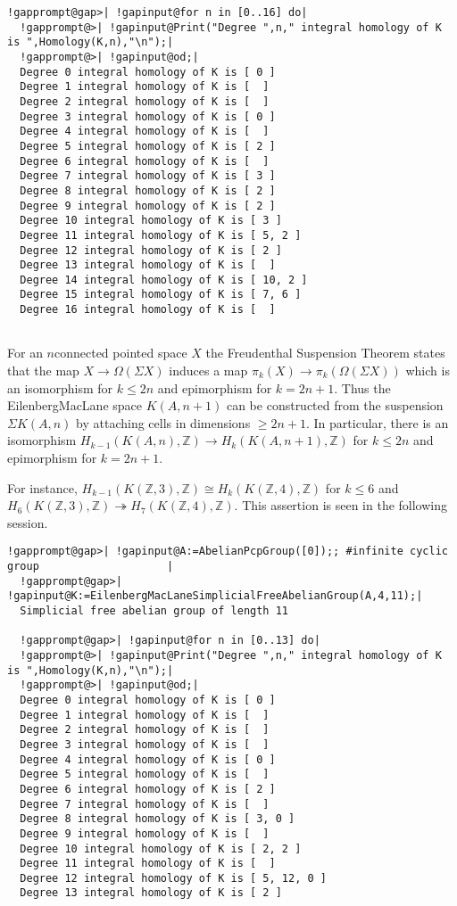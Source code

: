 \documentclass[a4paper,11pt]{report}
\begin{document}
{{\begin{Verbatim}[commandchars=!@|,fontsize=\small,frame=single,label=Example]
  !gapprompt@gap>| !gapinput@for n in [0..16] do|
  !gapprompt@>| !gapinput@Print("Degree ",n," integral homology of K is ",Homology(K,n),"\n");|
  !gapprompt@>| !gapinput@od;|
  Degree 0 integral homology of K is [ 0 ]
  Degree 1 integral homology of K is [  ]
  Degree 2 integral homology of K is [  ]
  Degree 3 integral homology of K is [ 0 ]
  Degree 4 integral homology of K is [  ]
  Degree 5 integral homology of K is [ 2 ]
  Degree 6 integral homology of K is [  ]
  Degree 7 integral homology of K is [ 3 ]
  Degree 8 integral homology of K is [ 2 ]
  Degree 9 integral homology of K is [ 2 ]
  Degree 10 integral homology of K is [ 3 ]
  Degree 11 integral homology of K is [ 5, 2 ]
  Degree 12 integral homology of K is [ 2 ]
  Degree 13 integral homology of K is [  ]
  Degree 14 integral homology of K is [ 10, 2 ]
  Degree 15 integral homology of K is [ 7, 6 ]
  Degree 16 integral homology of K is [  ]
  
\end{Verbatim}
 For an $n$\texttt{}connected pointed space $X$ the Freudenthal Suspension Theorem states that the map $X \rightarrow \Omega(\Sigma X)$ induces a map $\pi_k(X) \rightarrow \pi_k(\Omega(\Sigma X))$ which is an isomorphism for $k\le 2n$ and epimorphism for $k=2n+1$. Thus the Eilenberg\texttt{}MacLane space $K(A,n+1)$ can be constructed from the suspension $\Sigma K(A,n)$ by attaching cells in dimensions $\ge 2n+1$. In particular, there is an isomorphism $ H_{k-1}(K(A,n),\mathbb Z) \rightarrow H_k(K(A,n+1),\mathbb Z)$ for $k\le 2n$ and epimorphism for $k=2n+1$. 

 For instance, $ H_{k-1}(K(\mathbb Z,3),\mathbb Z) \cong H_k(K(\mathbb Z,4),\mathbb Z) $ for $k\le 6$ and $ H_6(K(\mathbb Z,3),\mathbb Z) \twoheadrightarrow H_7(K(\mathbb Z,4),\mathbb Z) $. This assertion is seen in the following session. 
\begin{Verbatim}[commandchars=!@|,fontsize=\small,frame=single,label=Example]
  !gapprompt@gap>| !gapinput@A:=AbelianPcpGroup([0]);; #infinite cyclic group                    |
  !gapprompt@gap>| !gapinput@K:=EilenbergMacLaneSimplicialFreeAbelianGroup(A,4,11);|
  Simplicial free abelian group of length 11
  
  !gapprompt@gap>| !gapinput@for n in [0..13] do|
  !gapprompt@>| !gapinput@Print("Degree ",n," integral homology of K is ",Homology(K,n),"\n");|
  !gapprompt@>| !gapinput@od;|
  Degree 0 integral homology of K is [ 0 ]
  Degree 1 integral homology of K is [  ]
  Degree 2 integral homology of K is [  ]
  Degree 3 integral homology of K is [  ]
  Degree 4 integral homology of K is [ 0 ]
  Degree 5 integral homology of K is [  ]
  Degree 6 integral homology of K is [ 2 ]
  Degree 7 integral homology of K is [  ]
  Degree 8 integral homology of K is [ 3, 0 ]
  Degree 9 integral homology of K is [  ]
  Degree 10 integral homology of K is [ 2, 2 ]
  Degree 11 integral homology of K is [  ]
  Degree 12 integral homology of K is [ 5, 12, 0 ]
  Degree 13 integral homology of K is [ 2 ]
  

\end{Verbatim}}}
\end{document}
